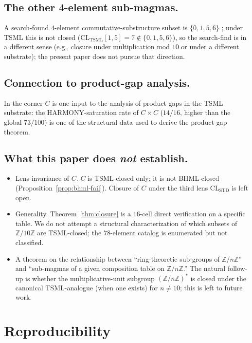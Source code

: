 \documentclass[11pt,reqno]{amsart}
\theoremstyle{plain}
\theoremstyle{definition}
\theoremstyle{remark}
\newcommand{\Z}{\mathbb{Z}}
\newcommand{\TSML}{\mathrm{TSML}}
\begin{document}
\subsection{The other $4$-element sub-magmas.}
A search-found $4$-element commutative-substructure subset is
$\{0, 1, 5, 6\}$ \cite{LensCatalog}; under TSML this is not closed
($\mathrm{CL}_\TSML[1, 5] = 7 \notin \{0,1,5,6\}$), so the search-find
is in a different sense (e.g., closure under multiplication mod $10$
or under a different substrate); the present paper does not pursue
that direction.

\subsection{Connection to product-gap analysis.}
In \cite{SandersGishProductGap} the corner $C$ is one input to the
analysis of product gaps in the TSML substrate: the
HARMONY-saturation rate of $C \times C$ ($14/16$, higher than the
global $73/100$) is one of the structural data used to derive the
product-gap theorem.

\subsection{What this paper does \emph{not} establish.}
\begin{itemize}
\item Lens-invariance of $C$.  $C$ is TSML-closed only; it is not
BHML-closed (Proposition~\ref{prop:bhml-fail}).  Closure of $C$ under
the third lens $\mathrm{CL}_\mathrm{STD}$ is left open.
\item Generality.  Theorem~\ref{thm:closure} is a $16$-cell direct
verification on a specific table.  We do not attempt a structural
characterization of which subsets of $\Z/10\Z$ are TSML-closed; the
$78$-element catalog is enumerated but not classified.
\item A theorem on the relationship between ``ring-theoretic
sub-groups of $\Z/n\Z$'' and ``sub-magmas of a given composition
table on $\Z/n\Z$.''  The natural follow-up is whether the
multiplicative-unit subgroup $(\Z/n\Z)^*$ is closed under the
canonical TSML-analogue (when one exists) for $n \neq 10$; this is
left to future work.
\end{itemize}

\section{Reproducibility}
\label{sec:repro}
\end{document}
